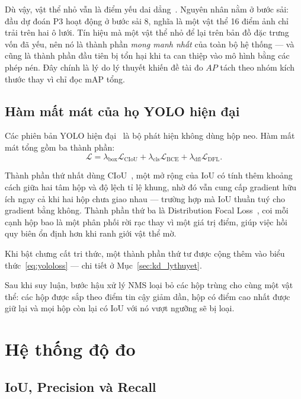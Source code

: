 Dù vậy, vật thể nhỏ vẫn là điểm yếu dai dẳng~\cite{tong2020smallobject}. Nguyên nhân nằm ở bước
sải: đầu dự đoán P3 hoạt động ở bước sải 8, nghĩa là một vật thể 16 điểm ảnh chỉ trải trên hai ô
lưới. Tín hiệu mà một vật thể nhỏ để lại trên bản đồ đặc trưng vốn đã yếu, nên nó là thành phần
\emph{mong manh nhất} của toàn bộ hệ thống --- và cũng là thành phần đầu tiên bị tổn hại khi ta can
thiệp vào mô hình bằng các phép nén. Đây chính là lý do lý thuyết khiến đề tài đo $AP$ tách theo
nhóm kích thước thay vì chỉ đọc mAP tổng.

\subsection{Hàm mất mát của họ YOLO hiện đại}

Các phiên bản YOLO hiện đại~\cite{jocher2023ultralytics} là bộ phát hiện không dùng hộp neo. Hàm
mất mát tổng gồm ba thành phần:
\begin{equation}
\label{eq:yololoss}
\mathcal{L} = \lambda_{\text{box}} \mathcal{L}_{\text{CIoU}}
            + \lambda_{\text{cls}} \mathcal{L}_{\text{BCE}}
            + \lambda_{\text{dfl}} \mathcal{L}_{\text{DFL}}.
\end{equation}

Thành phần thứ nhất dùng CIoU~\cite{zheng2020diou}, một mở rộng của IoU có tính thêm khoảng cách
giữa hai tâm hộp và độ lệch tỉ lệ khung, nhờ đó vẫn cung cấp gradient hữu ích ngay cả khi hai hộp
chưa giao nhau --- trường hợp mà IoU thuần tuý cho gradient bằng không. Thành phần thứ ba là
Distribution Focal Loss~\cite{li2020gfl}, coi mỗi cạnh hộp bao là một phân phối rời rạc thay vì một
giá trị điểm, giúp việc hồi quy biên ổn định hơn khi ranh giới vật thể mờ.

Khi bật chưng cất tri thức, một thành phần thứ tư được cộng thêm vào biểu
thức~\eqref{eq:yololoss} --- chi tiết ở Mục~\ref{sec:kd_lythuyet}.

Sau khi suy luận, bước hậu xử lý NMS loại bỏ các hộp trùng cho cùng một vật thể: các hộp được sắp
theo điểm tin cậy giảm dần, hộp có điểm cao nhất được giữ lại và mọi hộp còn lại có IoU với nó vượt
ngưỡng sẽ bị loại.

\section{Hệ thống độ đo}

\subsection{IoU, Precision và Recall}

